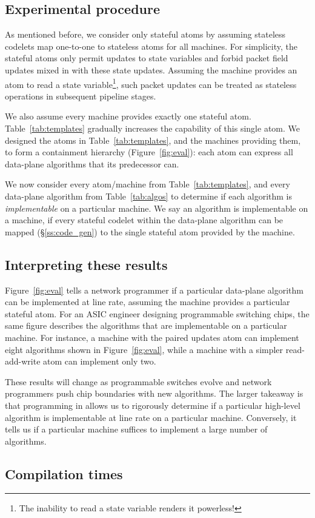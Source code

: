 \subsection{Experimental procedure}
As mentioned before, we consider only stateful atoms by assuming stateless
codelets map one-to-one to stateless atoms for all \absmachine machines. For
simplicity, the stateful atoms only permit updates to state variables and
forbid packet field updates mixed in with these state updates.  Assuming the
\absmachine machine provides an atom to read a state variable\footnote{The
inability to read a state variable renders it powerless!}, such packet updates
can be treated as stateless operations in subsequent pipeline stages.

We also assume every \absmachine machine provides exactly one stateful atom.
Table~\ref{tab:templates} gradually increases the capability of this single
atom.  We designed the atoms in Table~\ref{tab:templates}, and the \absmachine
machines providing them, to form a containment hierarchy
(Figure~\ref{fig:eval}): each atom can express all data-plane algorithms that
its predecessor can.

We now consider every atom/\absmachine machine from Table~\ref{tab:templates},
and every data-plane algorithm from Table~\ref{tab:algos} to determine if each
algorithm is \textit{implementable} on a particular \absmachine machine. We
say an algorithm is implementable on a \absmachine machine, if every stateful
codelet within the data-plane algorithm can be mapped (\S\ref{ss:code_gen}) to
the single stateful atom provided by the \absmachine machine.

\subsection{Interpreting these results}
Figure~\ref{fig:eval} tells a network programmer if a particular data-plane
algorithm can be implemented at line rate, assuming the \absmachine machine
provides a particular stateful atom. For an ASIC engineer designing
programmable switching chips, the same figure describes the algorithms that are
implementable on a particular \absmachine machine. For instance, a \absmachine
machine with the paired updates atom can implement eight algorithms shown in
Figure~\ref{fig:eval}, while a machine with a simpler read-add-write atom can
implement only two.

These results will change as programmable switches evolve and network
programmers push chip boundaries with new algorithms.  The larger takeaway is
that programming in \pktlanguage allows us to rigorously determine if a
particular high-level algorithm is implementable at line rate on a particular
\absmachine machine. Conversely, it tells us if a particular \absmachine
machine suffices to implement a large number of algorithms.

\subsection{Compilation times}
